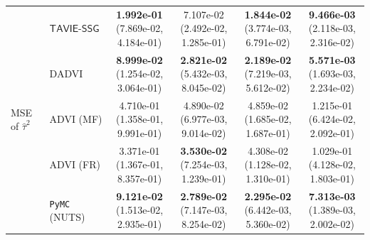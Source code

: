 \documentclass[12pt]{article}
\numberwithin{equation}{section}
\newcommand{\tssg}{\mathsf{TAVIE}\text{-}\mathsf{SSG}}
\begin{document}
{\begin{longtable}{llcccc}
\multirow{5}{*}{MSE of $\widehat{\tau}^{2}$}
& $\tssg$ & \makecell[c]{\textbf{1.992e-01}\\(7.869e-02, 4.184e-01)} & \makecell[c]{7.107e-02\\(2.492e-02, 1.285e-01)} & \makecell[c]{\textbf{1.844e-02}\\(3.774e-03, 6.791e-02)} & \makecell[c]{\textbf{9.466e-03}\\(2.118e-03, 2.316e-02)} \\
& DADVI & \makecell[c]{\textbf{8.999e-02}\\(1.254e-02, 3.064e-01)} & \makecell[c]{\textbf{2.821e-02}\\(5.432e-03, 8.045e-02)} & \makecell[c]{\textbf{2.189e-02}\\(7.219e-03, 5.612e-02)} & \makecell[c]{\textbf{5.571e-03}\\(1.693e-03, 2.234e-02)} \\
& ADVI (MF) & \makecell[c]{4.710e-01\\(1.358e-01, 9.991e-01)} & \makecell[c]{4.890e-02\\(6.977e-03, 9.014e-02)} & \makecell[c]{4.859e-02\\(1.685e-02, 1.687e-01)} & \makecell[c]{1.215e-01\\(6.424e-02, 2.092e-01)} \\
& ADVI (FR) & \makecell[c]{3.371e-01\\(1.367e-01, 8.357e-01)} & \makecell[c]{\textbf{3.530e-02}\\(7.254e-03, 1.239e-01)} & \makecell[c]{4.308e-02\\(1.128e-02, 1.310e-01)} & \makecell[c]{1.029e-01\\(4.128e-02, 1.803e-01)} \\
& \texttt{PyMC} (NUTS) & \makecell[c]{\textbf{9.121e-02}\\(1.513e-02, 2.935e-01)} & \makecell[c]{\textbf{2.789e-02}\\(7.147e-03, 8.254e-02)} & \makecell[c]{\textbf{2.295e-02}\\(6.442e-03, 5.360e-02)} & \makecell[c]{\textbf{7.313e-03}\\(1.389e-03, 2.002e-02)} \\
\hline


\end{longtable}}
\end{document}
